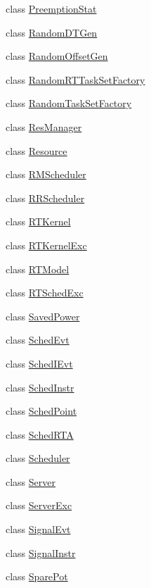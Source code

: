 \begin{DoxyCompactItemize}
class \hyperlink{classRTSim_1_1PreemptionStat}{Preemption\+Stat}
\item 
class \hyperlink{classRTSim_1_1RandomDTGen}{Random\+D\+T\+Gen}
\item 
class \hyperlink{classRTSim_1_1RandomOffsetGen}{Random\+Offset\+Gen}
\item 
class \hyperlink{classRTSim_1_1RandomRTTaskSetFactory}{Random\+R\+T\+Task\+Set\+Factory}
\item 
class \hyperlink{classRTSim_1_1RandomTaskSetFactory}{Random\+Task\+Set\+Factory}
\item 
class \hyperlink{classRTSim_1_1ResManager}{Res\+Manager}
\item 
class \hyperlink{classRTSim_1_1Resource}{Resource}
\item 
class \hyperlink{classRTSim_1_1RMScheduler}{R\+M\+Scheduler}
\item 
class \hyperlink{classRTSim_1_1RRScheduler}{R\+R\+Scheduler}
\item 
class \hyperlink{classRTSim_1_1RTKernel}{R\+T\+Kernel}
\item 
class \hyperlink{classRTSim_1_1RTKernelExc}{R\+T\+Kernel\+Exc}
\item 
class \hyperlink{classRTSim_1_1RTModel}{R\+T\+Model}
\item 
class \hyperlink{classRTSim_1_1RTSchedExc}{R\+T\+Sched\+Exc}
\item 
class \hyperlink{classRTSim_1_1SavedPower}{Saved\+Power}
\item 
class \hyperlink{classRTSim_1_1SchedEvt}{Sched\+Evt}
\item 
class \hyperlink{classRTSim_1_1SchedIEvt}{Sched\+I\+Evt}
\item 
class \hyperlink{classRTSim_1_1SchedInstr}{Sched\+Instr}
\item 
class \hyperlink{classRTSim_1_1SchedPoint}{Sched\+Point}
\item 
class \hyperlink{classRTSim_1_1SchedRTA}{Sched\+R\+TA}
\item 
class \hyperlink{classRTSim_1_1Scheduler}{Scheduler}
\item 
class \hyperlink{classRTSim_1_1Server}{Server}
\item 
class \hyperlink{classRTSim_1_1ServerExc}{Server\+Exc}
\item 
class \hyperlink{classRTSim_1_1SignalEvt}{Signal\+Evt}
\item 
class \hyperlink{classRTSim_1_1SignalInstr}{Signal\+Instr}
\item 
class \hyperlink{classRTSim_1_1SparePot}{Spare\+Pot}

\end{DoxyCompactItemize}
